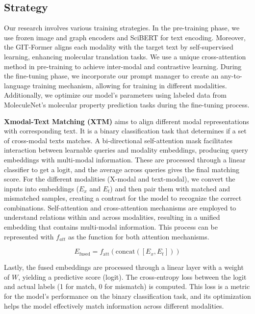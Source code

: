 \documentclass{article}
\begin{document}
\subsection{Strategy}
Our research involves various training strategies. In the pre-training phase, we use frozen image and graph encoders and SciBERT for text encoding. 
Moreover, the GIT-Former aligns each modality with the target text by self-supervised learning, enhancing molecular translation tasks. 
We use a unique cross-attention method in pre-training to achieve inter-modal and contrastive learning. 
During the fine-tuning phase, we incorporate our prompt manager to create an any-to-language training mechanism, allowing for training in different modalities. 
Additionally, we optimize our model's parameters using labeled data from MoleculeNet's\cite{wu2018moleculenet} molecular property prediction tasks during the fine-tuning process.

\textbf{Xmodal-Text Matching (XTM)} aims to align different modal representations with corresponding text. It is a binary classification task that determines if a set of cross-modal texts matches. A bi-directional self-attention mask facilitates interaction between learnable queries and modality embeddings, producing query embeddings with multi-modal information. These are processed through a linear classifier to get a logit, and the average across queries gives the final matching score. For the different modalities (X-modal and text-modal), we convert the inputs into embeddings ($E_x$ and $E_t$) and then pair them with matched and mismatched samples, creating a contrast for the model to recognize the correct combinations. Self-attention and cross-attention mechanisms are employed to understand relations within and across modalities, resulting in a unified embedding that contains multi-modal information. This process can be represented with $f_{att}$ as the function for both attention mechanisms.

\begin{equation}
E_{\text{fused}} = f_{\text{att}}(\text{concat}([E_x, E_t]))
\end{equation}

Lastly, the fused embeddings are processed through a linear layer with a weight of $W$, yielding a predictive score (logit). The cross-entropy loss between the logit and actual labels (1 for match, 0 for mismatch) is computed. This loss is a metric for the model's performance on the binary classification task, and its optimization helps the model effectively match information across different modalities.
\end{document}
